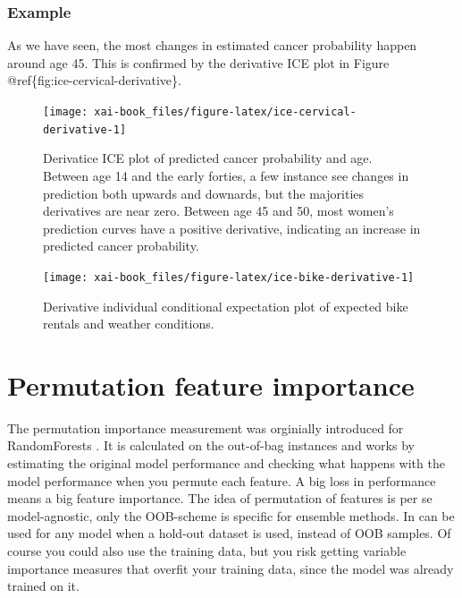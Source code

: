 \documentclass[12pt,]{krantz}
\theoremstyle{definition}
\theoremstyle{definition}
\theoremstyle{definition}
\theoremstyle{remark}
\begin{document}
\citep{goldstein2015peeking}

\subsubsection{Example}\label{example-2}

As we have seen, the most changes in estimated cancer probability happen
around age 45. This is confirmed by the derivative ICE plot in Figure
@ref\{fig:ice-cervical-derivative\}.

\begin{figure}

{\centering \texttt{[image: xai-book\_files/figure-latex/ice-cervical-derivative-1]} 

}

\caption{Derivatice ICE plot of predicted cancer probability and age. Between age 14 and the early forties, a few instance see changes in prediction both upwards and downards, but the majorities derivatives are near zero. Between age 45 and 50, most women's prediction curves have a positive derivative, indicating an increase in predicted cancer probability.}\label{fig:ice-cervical-derivative}
\end{figure}

\begin{figure}

{\centering \texttt{[image: xai-book\_files/figure-latex/ice-bike-derivative-1]} 

}

\caption{Derivative individual conditional expectation plot of expected bike rentals and weather conditions.}\label{fig:ice-bike-derivative}
\end{figure}

\section{Permutation feature
importance}\label{permutation-feature-importance}

The permutation importance measurement was orginially introduced for
RandomForests \citep{breiman2001random}. It is calculated on the
out-of-bag instances and works by estimating the original model
performance and checking what happens with the model performance when
you permute each feature. A big loss in performance means a big feature
importance. The idea of permutation of features is per se
model-agnostic, only the OOB-scheme is specific for ensemble methods. In
can be used for any model when a hold-out dataset is used, instead of
OOB samples. Of course you could also use the training data, but you
risk getting variable importance measures that overfit your training
data, since the model was already trained on it.
\end{document}
